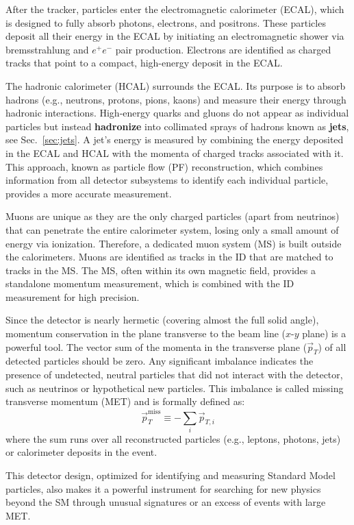 After the tracker, particles enter the electromagnetic calorimeter (ECAL), which is designed to fully absorb photons, electrons, and positrons. These particles deposit all their energy in the ECAL by initiating an electromagnetic shower via bremsstrahlung and $e^{+}e^{-}$ pair production. Electrons are identified as charged tracks that point to a compact, high-energy deposit in the ECAL.

The hadronic calorimeter (HCAL) surrounds the ECAL. Its purpose is to absorb hadrons (e.g., neutrons, protons, pions, kaons) and measure their energy through hadronic interactions. High-energy quarks and gluons do not appear as individual particles but instead \textbf{hadronize} into collimated sprays of hadrons known as \textbf{jets}, see Sec.~\ref{sec:jets}. A jet's energy is measured by combining the energy deposited in the ECAL and HCAL with the momenta of charged tracks associated with it. This approach, known as particle flow (PF) reconstruction, which combines information from all detector subsystems to identify each individual particle, provides a more accurate measurement.


Muons are unique as they are the only charged particles (apart from neutrinos) that can penetrate the entire calorimeter system, losing only a small amount of energy via ionization. Therefore, a dedicated muon system (MS) is built outside the calorimeters. Muons are identified as tracks in the ID that are matched to tracks in the MS. The MS, often within its own magnetic field, provides a standalone momentum measurement, which is combined with the ID measurement for high precision.

Since the detector is nearly hermetic (covering almost the full solid angle), momentum conservation in the plane transverse to the beam line ($x$-$y$ plane) is a powerful tool. The vector sum of the momenta in the transverse plane ($\vec{p}_T$) of all detected particles should be zero. Any significant imbalance indicates the presence of undetected, neutral particles that did not interact with the detector, such as neutrinos or hypothetical new particles. This imbalance is called missing transverse momentum (MET) and is formally defined as:
$$
\vec{p}_T^{\text{miss}} \equiv -\sum_i \vec{p}_{T,i}
$$
where the sum runs over all reconstructed particles (e.g., leptons, photons, jets) or calorimeter deposits in the event.

This detector design, optimized for identifying and measuring Standard Model particles, also makes it a powerful instrument for searching for new physics beyond the SM through unusual signatures or an excess of events with large MET.

